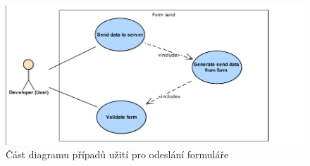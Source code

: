 \begin{figure}[h!]
\includegraphics[width=\textwidth, trim=4 4 4 4, clip]{figures/useCaseFormSend}
\caption{Část diagramu případů užití pro odeslání formuláře}
\label{img:useCaseModelFormSend}
\end{figure}

